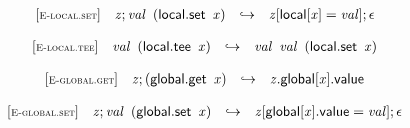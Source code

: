 $$
\begin{array}{@{}l@{}lcl@{}l@{}}
{[\textsc{\scriptsize E{-}local.set}]} \quad & {\mathit{z}} ; {\mathit{val}}~\,(\mathsf{local.set}~\,{\mathit{x}}) &\hookrightarrow& {\mathit{z}}{}[\mathsf{local}{}[{\mathit{x}}] = {\mathit{val}}] ; \epsilon &  \\
\end{array}
$$

$$
\begin{array}{@{}l@{}lcl@{}l@{}}
{[\textsc{\scriptsize E{-}local.tee}]} \quad & {\mathit{val}}~\,(\mathsf{local.tee}~\,{\mathit{x}}) &\hookrightarrow& {\mathit{val}}~\,{\mathit{val}}~\,(\mathsf{local.set}~\,{\mathit{x}}) &  \\
\end{array}
$$

\vspace{1ex}

$$
\begin{array}{@{}l@{}lcl@{}l@{}}
{[\textsc{\scriptsize E{-}global.get}]} \quad & {\mathit{z}} ; (\mathsf{global.get}~\,{\mathit{x}}) &\hookrightarrow& {{\mathit{z}}.\mathsf{global}}{{}[{\mathit{x}}]}.\mathsf{value} &  \\
\end{array}
$$

$$
\begin{array}{@{}l@{}lcl@{}l@{}}
{[\textsc{\scriptsize E{-}global.set}]} \quad & {\mathit{z}} ; {\mathit{val}}~\,(\mathsf{global.set}~\,{\mathit{x}}) &\hookrightarrow& {\mathit{z}}{}[\mathsf{global}{}[{\mathit{x}}].\mathsf{value} = {\mathit{val}}] ; \epsilon &  \\
\end{array}
$$

\vspace{1ex}

